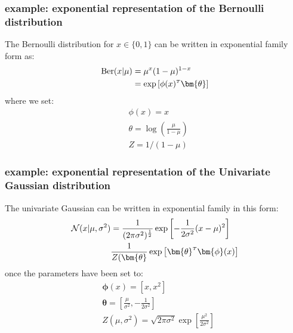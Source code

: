 \subsubsection*{example: exponential representation of the Bernoulli distribution}
The Bernoulli distribution for $x\in\{0,1\}$ can be written in exponential family form as:
\begin{equation}
\begin{split}
    \text{Ber}(x|\mu) &= \mu^x(1-\mu)^{1-x} \\
                      &= \exp{\left[\transpose{\phi(x)}\bm{\theta} \right]}
\end{split}
\end{equation}
where we set:
\begin{align*}
  & \phi(x) = x \\
  & \theta  = \log\left(\frac{\mu}{1-\mu}\right) \\
  & Z = 1/(1-\mu)
\end{align*}

\subsubsection*{example: exponential representation of the Univariate Gaussian distribution}
The univariate Gaussian can be written in exponential family in this form:
\begin{equation}
\begin{split}
        \mathcal{N}(x|\mu,\sigma^2) &= \frac{1}{(2\pi\sigma^2)^\frac{1}{2}} \exp{\left[-\frac{1}{2\sigma^2}(x-\mu)^2\right]} \\
        & \frac{1}{Z(\bm{\theta}}\exp{\left[\transpose{\bm{\theta}}\bm{\phi}(x)\right]}
\end{split}
\end{equation}
once the parameters have been set to:
\begin{align*}
    & \bm{\phi}(x) = \left[ x, x^2 \right] \\
    & \bm{\theta}  = \left[ \frac{\mu}{\sigma^2}, -\frac{1}{2\sigma^2} \right] \\
    & Z(\mu,\sigma^2) = \sqrt{{2\pi\sigma^2}} \exp{\left[ \frac{\mu^2}{2\sigma^2} \right]}
\end{align*}

